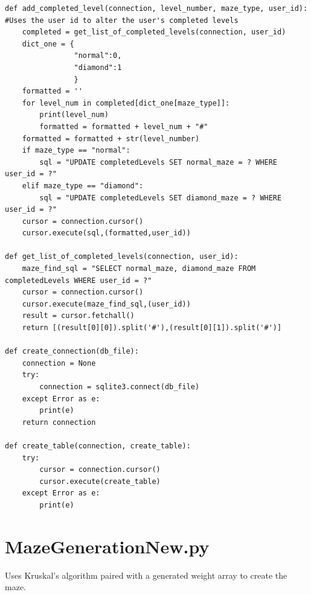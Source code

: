 \documentclass{article}
\begin{document}
\begin{lstlisting}
def add_completed_level(connection, level_number, maze_type, user_id):    #Uses the user id to alter the user's completed levels
    completed = get_list_of_completed_levels(connection, user_id)
    dict_one = {
                "normal":0,
                "diamond":1
                }
    formatted = ''
    for level_num in completed[dict_one[maze_type]]:
        print(level_num)
        formatted = formatted + level_num + "#"
    formatted = formatted + str(level_number)
    if maze_type == "normal":
        sql = "UPDATE completedLevels SET normal_maze = ? WHERE user_id = ?"
    elif maze_type == "diamond":
        sql = "UPDATE completedLevels SET diamond_maze = ? WHERE user_id = ?"
    cursor = connection.cursor()
    cursor.execute(sql,(formatted,user_id))

def get_list_of_completed_levels(connection, user_id):
    maze_find_sql = "SELECT normal_maze, diamond_maze FROM completedLevels WHERE user_id = ?"
    cursor = connection.cursor()
    cursor.execute(maze_find_sql,(user_id))
    result = cursor.fetchall()
    return [(result[0][0]).split('#'),(result[0][1]).split('#')]

def create_connection(db_file):
    connection = None
    try:
        connection = sqlite3.connect(db_file)
    except Error as e:
        print(e)
    return connection

def create_table(connection, create_table):
    try:
        cursor = connection.cursor()
        cursor.execute(create_table)
    except Error as e:
        print(e)
\end{lstlisting}



\clearpage
\section{MazeGenerationNew.py}
Uses Kruskal’s algorithm paired with a generated weight array to create the maze.
\end{document}
